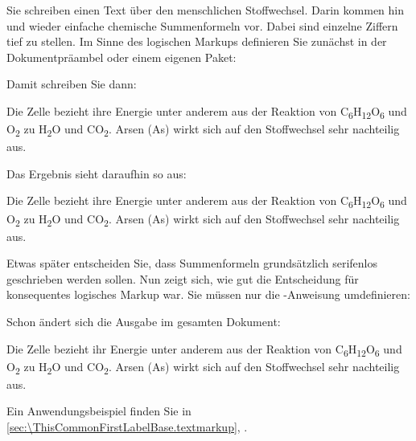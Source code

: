     \begin{Example}
      Sie schreiben einen Text über den menschlichen Stoffwechsel. Darin
      kommen hin und wieder einfache chemische Summenformeln vor. Dabei sind
      einzelne Ziffern tief zu stellen. Im Sinne des logischen Markups
      definieren Sie zunächst in der Dokumentpräambel oder einem eigenen
      Paket:
\begin{lstcode}
  \newcommand*{\Molek}[2]{#1\textsubscript{#2}}
\end{lstcode}
      \newcommand*{\Molek}[2]{#1\textsubscript{#2}}%
      Damit schreiben Sie dann:
\begin{lstcode}
  Die Zelle bezieht ihre Energie unter anderem aus
  der Reaktion von \Molek C6\Molek H{12}\Molek O6 
  und \Molek O2 zu \Molek H2\Molek O{} und 
  \Molek C{}\Molek O2. Arsen (\Molek{As}{}) wirkt
  sich auf den Stoffwechsel sehr nachteilig aus.
\end{lstcode}
      Das Ergebnis sieht daraufhin so aus:
      \begin{ShowOutput}
        Die Zelle bezieht ihre Energie unter anderem
        aus der Reaktion von 
        \Molek C6\Molek H{12}\Molek O6 und \Molek O2 zu
        \Molek H2\Molek O{} und \Molek C{}\Molek O2.  
        Arsen (\Molek{As}{}) wirkt sich auf
        den Stoffwechsel sehr nachteilig aus.
      \end{ShowOutput}

      Etwas später entscheiden Sie, dass Summenformeln grundsätzlich
      serifenlos geschrieben werden sollen. Nun zeigt sich, wie gut die
      Entscheidung für konsequentes logisches Markup war. Sie müssen nur die
      -Anweisung umdefinieren:
\begin{lstcode}
  \newcommand*{\Molek}[2]{%
    \textsf{#1\textsubscript{#2}}%
  }
\end{lstcode}
      \renewcommand*{\Molek}[2]{\textsf{#1\textsubscript{#2}}}%
      Schon ändert sich die Ausgabe im gesamten Dokument:
      \begin{ShowOutput}
        Die Zelle bezieht ihr Energie unter anderem aus der Reaktion von
        \Molek C6\Molek H{12}\Molek O6 und \Molek O2 zu \Molek H2\Molek
        O{} und \Molek C{}\Molek O2.  Arsen (\Molek{As}{}) wirkt sich
        auf den Stoffwechsel sehr nachteilig aus.
      \end{ShowOutput}
    \end{Example}
    %
  \else%
    Ein Anwendungsbeispiel finden Sie in
    \autoref{sec:\ThisCommonFirstLabelBase.textmarkup},
    .%
  \fi%
  \EndIndexGroup%
\fi


